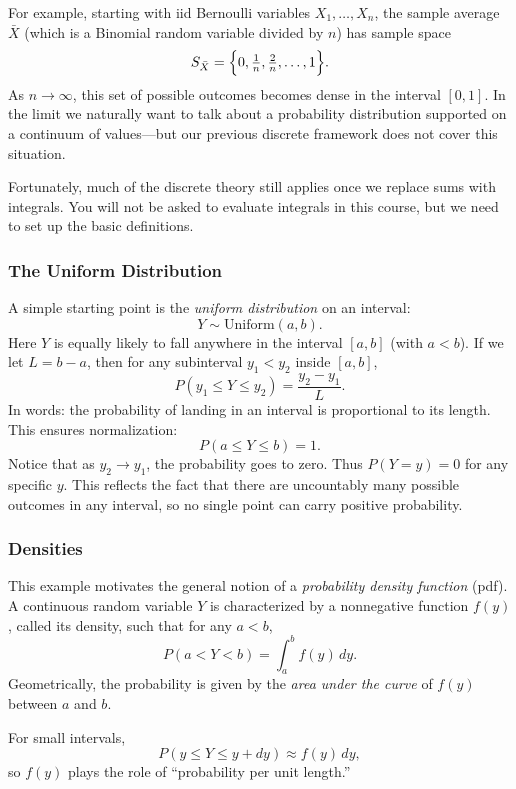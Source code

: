 For example, starting with iid Bernoulli variables $X_1,\dots,X_n$, the sample average $\bar{X}$ (which is a Binomial random variable divided by $n$)  has sample space 
\[
S_{\bar{X}} = \Bigl\{0,\tfrac{1}{n},\tfrac{2}{n},\dots,1\Bigr\}.
\]  
As \(n \to \infty\), this set of possible outcomes becomes dense in the interval \([0,1]\). In the limit we naturally want to talk about a probability distribution supported on a continuum of values---but our previous discrete framework does not cover this situation.  

Fortunately, much of the discrete theory still applies once we replace sums with integrals. You will not be asked to evaluate integrals in this course, but we need to set up the basic definitions.  



\subsubsection*{The Uniform Distribution}

A simple starting point is the \emph{uniform distribution} on an interval:  
\[
Y \sim \text{Uniform}(a,b).
\]  
Here \(Y\) is equally likely to fall anywhere in the interval \([a,b]\) (with \(a<b\)). If we let \(L = b-a\), then for any subinterval \(y_1 < y_2\) inside \([a,b]\),  
\[
P(y_1 \le Y \le y_2) = \frac{y_2-y_1}{L}.
\]  
In words: the probability of landing in an interval is proportional to its length. This ensures normalization:  
\[
P(a \le Y \le b) = 1.
\]  
Notice that as \(y_2 \to y_1\), the probability goes to zero. Thus \(P(Y=y)=0\) for any specific \(y\). This reflects the fact that there are uncountably many possible outcomes in any interval, so no single point can carry positive probability.  



\subsubsection*{Densities}

This example motivates the general notion of a \emph{probability density function} (pdf). A continuous random variable \(Y\) is characterized by a nonnegative function \(f(y)\), called its density, such that for any \(a<b\),  
\[
P(a < Y < b) = \int_a^b f(y)\,dy.
\]  
Geometrically, the probability is given by the \emph{area under the curve} of \(f(y)\) between \(a\) and \(b\).  

For small intervals,  
\[
P(y \le Y \le y+dy) \approx f(y)\,dy,
\]  
so \(f(y)\) plays the role of ``probability per unit length.''  

